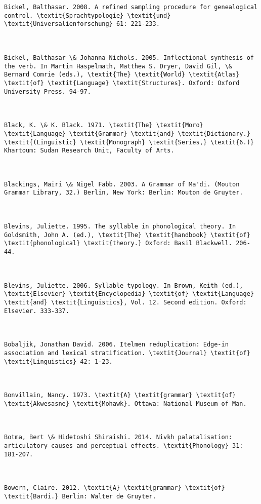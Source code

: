 \begin{verbatim}
Bickel, Balthasar. 2008. A refined sampling procedure for genealogical control. \textit{Sprachtypologie} \textit{und} \textit{Universalienforschung} 61: 221-233.



Bickel, Balthasar \& Johanna Nichols. 2005. Inflectional synthesis of the verb. In Martin Haspelmath, Matthew S. Dryer, David Gil, \& Bernard Comrie (eds.), \textit{The} \textit{World} \textit{Atlas} \textit{of} \textit{Language} \textit{Structures}. Oxford: Oxford University Press. 94-97.



Black, K. \& K. Black. 1971. \textit{The} \textit{Moro} \textit{Language} \textit{Grammar} \textit{and} \textit{Dictionary.} \textit{(Linguistic} \textit{Monograph} \textit{Series,} \textit{6.)} Khartoum: Sudan Research Unit, Faculty of Arts.



Blackings, Mairi \& Nigel Fabb. 2003. A Grammar of Ma'di. (Mouton Grammar Library, 32.) Berlin, New York: Berlin: Mouton de Gruyter. 



Blevins, Juliette. 1995. The syllable in phonological theory. In Goldsmith, John A. (ed.), \textit{The} \textit{handbook} \textit{of} \textit{phonological} \textit{theory.} Oxford: Basil Blackwell. 206-44.



Blevins, Juliette. 2006. Syllable typology. In Brown, Keith (ed.), \textit{Elsevier} \textit{Encyclopedia} \textit{of} \textit{Language} \textit{and} \textit{Linguistics}, Vol. 12. Second edition. Oxford: Elsevier. 333-337.



Bobaljik, Jonathan David. 2006. Itelmen reduplication: Edge-in association and lexical stratification. \textit{Journal} \textit{of} \textit{Linguistics} 42: 1-23.



Bonvillain, Nancy. 1973. \textit{A} \textit{grammar} \textit{of} \textit{Akwesasne} \textit{Mohawk}. Ottawa: National Museum of Man.



Botma, Bert \& Hidetoshi Shiraishi. 2014. Nivkh palatalisation: articulatory causes and perceptual effects. \textit{Phonology} 31: 181-207.



Bowern, Claire. 2012. \textit{A} \textit{grammar} \textit{of} \textit{Bardi.} Berlin: Walter de Gruyter.




\end{verbatim}
